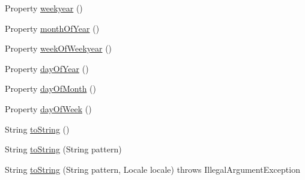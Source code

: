 \begin{DoxyCompactItemize}
\item 
Property \hyperlink{classorg_1_1joda_1_1time_1_1_local_date_a6895acbe2f8b0ff691f5163755086c4c}{weekyear} ()
\item 
Property \hyperlink{classorg_1_1joda_1_1time_1_1_local_date_a00923ad74b6ab2f01e45d3f4804f15f7}{month\-Of\-Year} ()
\item 
Property \hyperlink{classorg_1_1joda_1_1time_1_1_local_date_ad3d6323943a3c94677504f5c760a7ea4}{week\-Of\-Weekyear} ()
\item 
Property \hyperlink{classorg_1_1joda_1_1time_1_1_local_date_a6c031321a4d230964a4b5be5cc9dc47b}{day\-Of\-Year} ()
\item 
Property \hyperlink{classorg_1_1joda_1_1time_1_1_local_date_a876472f9f0711437971e9b5c029b7474}{day\-Of\-Month} ()
\item 
Property \hyperlink{classorg_1_1joda_1_1time_1_1_local_date_a9462e456874d88c9daacf4b8ea50f608}{day\-Of\-Week} ()
\item 
String \hyperlink{classorg_1_1joda_1_1time_1_1_local_date_a98a64f52e3031c0417cf2f58925e3834}{to\-String} ()
\item 
String \hyperlink{classorg_1_1joda_1_1time_1_1_local_date_ad0dbfe0ef8d195542e9f73dec55ae65c}{to\-String} (String pattern)
\item 
String \hyperlink{classorg_1_1joda_1_1time_1_1_local_date_a8581bf8398282f963fa4d995e99d7a8d}{to\-String} (String pattern, Locale locale)  throws Illegal\-Argument\-Exception 
\end{DoxyCompactItemize}
